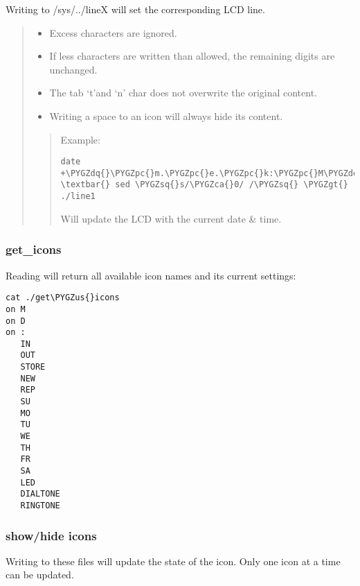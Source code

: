\documentclass[a4paper,8pt,english]{sphinxmanual}
\def\PYGZus{\char`\_}
\def\PYGZca{\char`\^}
\def\PYGZgt{\char`\>}
\def\PYGZpc{\char`\%}
\def\PYGZsq{\char`\'}
\def\PYGZdq{\char`\"}
\renewcommand\PYGZsq{\textquotesingle}
\begin{document}
Writing to /sys/../lineX will set the corresponding LCD line.
\begin{quote}
\begin{itemize}
\item {} 
Excess characters are ignored.

\item {} 
If less characters are written than allowed, the remaining digits are
unchanged.

\item {} 
The tab `t'and `n' char does not overwrite the original content.

\item {} 
Writing a space to an icon will always hide its content.

\end{itemize}
\begin{quote}

Example:

\begin{Verbatim}[commandchars=\\\{\}]
date +\PYGZdq{}\PYGZpc{}m.\PYGZpc{}e.\PYGZpc{}k:\PYGZpc{}M\PYGZdq{}  \textbar{} sed \PYGZsq{}s/\PYGZca{}0/ /\PYGZsq{} \PYGZgt{} ./line1
\end{Verbatim}

Will update the LCD with the current date \& time.
\end{quote}
\end{quote}


\subsubsection{get\_icons}
\label{input/devices/yealink:get-icons}
Reading will return all available icon names and its current settings:

\begin{Verbatim}[commandchars=\\\{\}]
cat ./get\PYGZus{}icons
on M
on D
on :
   IN
   OUT
   STORE
   NEW
   REP
   SU
   MO
   TU
   WE
   TH
   FR
   SA
   LED
   DIALTONE
   RINGTONE
\end{Verbatim}


\subsubsection{show/hide icons}
\label{input/devices/yealink:show-hide-icons}
Writing to these files will update the state of the icon.
Only one icon at a time can be updated.
\end{document}
